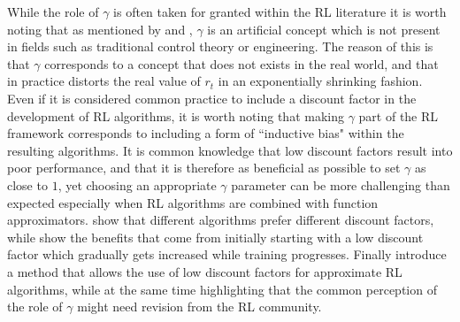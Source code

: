 While the role of $\gamma$ is often taken for granted within the RL literature it is worth noting that as mentioned by \citet{hessel2019inductive} and \citet{schmidhuber2019reinforcement}, $\gamma$ is an artificial concept which is not present in fields such as traditional control theory or engineering. The reason of this is that $\gamma$ corresponds to a concept that does not exists in the real world, and that in practice distorts the real value of $r_t$ in an exponentially shrinking fashion. Even if it is considered common practice to include a discount factor in the development of RL algorithms, it is worth noting that making $\gamma$ part of the RL framework corresponds to including a form of ``inductive bias" within the resulting algorithms. It is common knowledge that low discount factors result into poor performance, and that it is therefore as beneficial as possible to set $\gamma$ as close to $1$, yet choosing an appropriate $\gamma$ parameter can be more challenging than expected especially when RL algorithms are combined with function approximators. \citet{wiering2009qv} show that different algorithms prefer different discount factors, while \citet{franccois2015discount} show the benefits that come from initially starting with a low discount factor which gradually gets increased while training progresses. Finally \citet{vanseijen2019using} introduce a method that allows the use of low discount factors for approximate RL algorithms, while at the same time highlighting that the common perception of the role of $\gamma$ might need revision from the RL community.             

